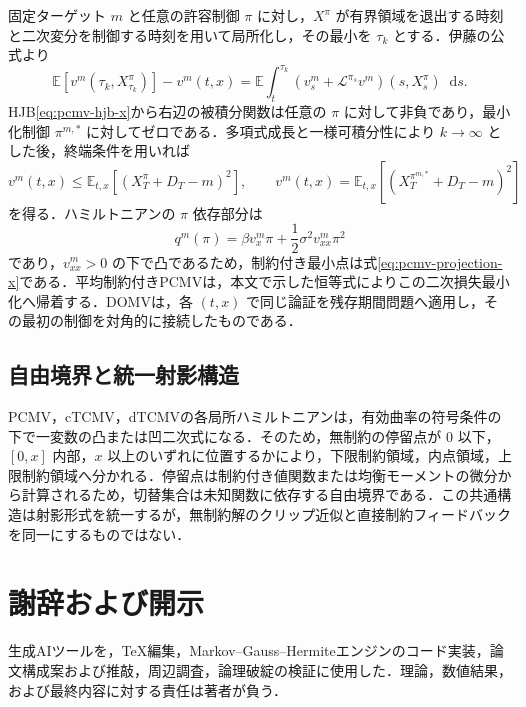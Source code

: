 \documentclass[10pt,a4paper]{article}
\theoremstyle{plain}
\theoremstyle{definition}
\newcommand{\E}{\mathbb{E}}
\newcommand{\Lop}{\mathcal{L}}
\newcommand{\dd}{\mathop{}\!\mathrm{d}}
\begin{document}
固定ターゲット $m$ と任意の許容制御 $\pi$ に対し，$X^\pi$ が有界領域を退出する時刻と二次変分を制御する時刻を用いて局所化し，その最小を $\tau_k$ とする．伊藤の公式より
\begin{equation}
 \E[v^m(\tau_k,X_{\tau_k}^\pi)]-v^m(t,x)
 =\E\int_t^{\tau_k}
 \left(v_s^m+\Lop^{\pi_s}v^m\right)(s,X_s^\pi)\dd s.
 \label{eq:app-pcmv-ito}
\end{equation}
HJB\eqref{eq:pcmv-hjb-x}から右辺の被積分関数は任意の $\pi$ に対して非負であり，最小化制御 $\pi^{m,*}$ に対してゼロである．多項式成長と一様可積分性により $k\to\infty$ とした後，終端条件を用いれば
\[
 v^m(t,x)\leq \E_{t,x}[(X_T^\pi+D_T-m)^2],
 \qquad
 v^m(t,x)=\E_{t,x}[(X_T^{\pi^{m,*}}+D_T-m)^2]
\]
を得る．ハミルトニアンの $\pi$ 依存部分は
\[
 q^m(\pi)=\beta v_x^m\pi+\frac12\sigma^2v_{xx}^m\pi^2
\]
であり，$v_{xx}^m>0$ の下で凸であるため，制約付き最小点は式\eqref{eq:pcmv-projection-x}である．平均制約付きPCMVは，本文で示した恒等式によりこの二次損失最小化へ帰着する．DOMVは，各 $(t,x)$ で同じ論証を残存期間問題へ適用し，その最初の制御を対角的に接続したものである．

\subsection*{自由境界と統一射影構造}

PCMV，cTCMV，dTCMVの各局所ハミルトニアンは，有効曲率の符号条件の下で一変数の凸または凹二次式になる．そのため，無制約の停留点が $0$ 以下，$[0,x]$ 内部，$x$ 以上のいずれに位置するかにより，下限制約領域，内点領域，上限制約領域へ分かれる．停留点は制約付き値関数または均衡モーメントの微分から計算されるため，切替集合は未知関数に依存する自由境界である．この共通構造は射影形式を統一するが，無制約解のクリップ近似と直接制約フィードバックを同一にするものではない．


\section*{謝辞および開示}
生成AIツールを，TeX編集，Markov--Gauss--Hermiteエンジンのコード実装，論文構成案および推敲，周辺調査，論理破綻の検証に使用した．理論，数値結果，および最終内容に対する責任は著者が負う．
\end{document}
